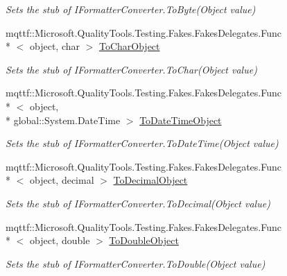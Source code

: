 \begin{DoxyCompactItemize}
\begin{DoxyCompactList}\small\item\em Sets the stub of I\-Formatter\-Converter.\-To\-Byte(\-Object value)\end{DoxyCompactList}\item 
mqttf\-::\-Microsoft.\-Quality\-Tools.\-Testing.\-Fakes.\-Fakes\-Delegates.\-Func\\*
$<$ object, char $>$ \hyperlink{class_system_1_1_runtime_1_1_serialization_1_1_fakes_1_1_stub_i_formatter_converter_a322b4c0e77f2befa03833d5a405733b2}{To\-Char\-Object}
\begin{DoxyCompactList}\small\item\em Sets the stub of I\-Formatter\-Converter.\-To\-Char(\-Object value)\end{DoxyCompactList}\item 
mqttf\-::\-Microsoft.\-Quality\-Tools.\-Testing.\-Fakes.\-Fakes\-Delegates.\-Func\\*
$<$ object, \\*
global\-::\-System.\-Date\-Time $>$ \hyperlink{class_system_1_1_runtime_1_1_serialization_1_1_fakes_1_1_stub_i_formatter_converter_a2ae1547c6e3b3db576843ecdf51a16b8}{To\-Date\-Time\-Object}
\begin{DoxyCompactList}\small\item\em Sets the stub of I\-Formatter\-Converter.\-To\-Date\-Time(\-Object value)\end{DoxyCompactList}\item 
mqttf\-::\-Microsoft.\-Quality\-Tools.\-Testing.\-Fakes.\-Fakes\-Delegates.\-Func\\*
$<$ object, decimal $>$ \hyperlink{class_system_1_1_runtime_1_1_serialization_1_1_fakes_1_1_stub_i_formatter_converter_a7e4396e489695b79eb0eb3df6bfe6033}{To\-Decimal\-Object}
\begin{DoxyCompactList}\small\item\em Sets the stub of I\-Formatter\-Converter.\-To\-Decimal(\-Object value)\end{DoxyCompactList}\item 
mqttf\-::\-Microsoft.\-Quality\-Tools.\-Testing.\-Fakes.\-Fakes\-Delegates.\-Func\\*
$<$ object, double $>$ \hyperlink{class_system_1_1_runtime_1_1_serialization_1_1_fakes_1_1_stub_i_formatter_converter_a7705a850e99590a74276d6712581977d}{To\-Double\-Object}
\begin{DoxyCompactList}\small\item\em Sets the stub of I\-Formatter\-Converter.\-To\-Double(\-Object value)\end{DoxyCompactList}\item 

\end{DoxyCompactItemize}

